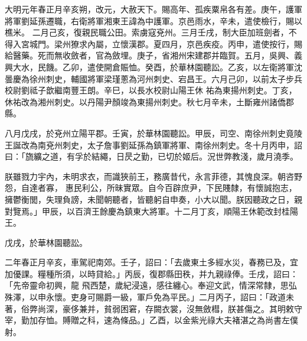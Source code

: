 \begin{pinyinscope}
 大明元年春正月辛亥朔，改元，大赦天下。賜高年、孤疾粟帛各有差。庚午，護軍將軍劉延孫遷職，右衛將軍湘東王諱為中護軍。京邑雨水，辛未，遣使檢行，賜以樵米。
 二月己亥，復親民職公田。索虜寇兗州。三月壬戌，制大臣加班劍者，不得入宮城門。梁州獠求內屬，立懷漢郡。夏四月，京邑疾疫。丙申，遣使按行，賜給醫藥。死而無收斂者，官為斂埋。庚子，省湘州宋建郡并臨賀。五月，吳興、義興大水，民饑。乙卯，遣使開倉賑恤。癸酉，於華林園聽訟。乙亥，以左衛將軍沈曇慶為徐州刺史，輔國將軍梁瑾蔥為河州刺史、宕昌王。六月己卯，以前太子步兵校尉劉祗子歆繼南豐王朗。辛巳，以長水校尉山陽王休
 祐為東揚州刺史。丁亥，休祐改為湘州刺史。以丹陽尹顏竣為東揚州刺史。秋七月辛未，土斷雍州諸僑郡縣。



 八月戊戌，於兗州立陽平郡。壬寅，於華林園聽訟。甲辰，司空、南徐州刺史竟陵王誕改為南兗州刺史，太子詹事劉延孫為鎮軍將軍、南徐州刺史。冬十月丙申，詔曰：「旒纊之道，有孚於結繩，日昃之勤，已切於姬后。況世弊教淺，歲月澆季。



 朕雖戮力宇內，未明求衣，而識狹前王，務廣昔代，永言菲德，其愧良深。朝咨野怨，自達者寡，
 惠民利公，所昧實眾。自今百辟庶尹，下民賤隸，有懷誠抱志，擁鬱衡閭，失理負謗，未聞朝聽者，皆聽躬自申奏，小大以聞。朕因聽政之日，親對覽焉。」甲辰，以百濟王餘慶為鎮東大將軍。十二月丁亥，順陽王休範改封桂陽王。



 戊戌，於華林園聽訟。



 二年春正月辛亥，車駕祀南郊。壬子，詔曰：「去歲東土多經水災，春務已及，宜加優課。糧種所須，以時貸給。」丙辰，復郡縣田秩，并九親祿俸。壬戌，詔曰：「先帝靈命初興，龍
 飛西楚，歲紀浸遠，感往纏心。奉迎文武，情深常隸，思弘殊澤，以申永懷。吏身可賜爵一級，軍戶免為平民。」二月丙子，詔曰：「政道未著，俗弊尚深，豪侈兼并，貧弱困窘，存闕衣裳，沒無斂槥，朕甚傷之。其明敕守宰，勤加存恤。賻贈之科，速為條品。」乙酉，以金紫光祿大夫褚湛之為尚書左僕射。




\end{pinyinscope}
